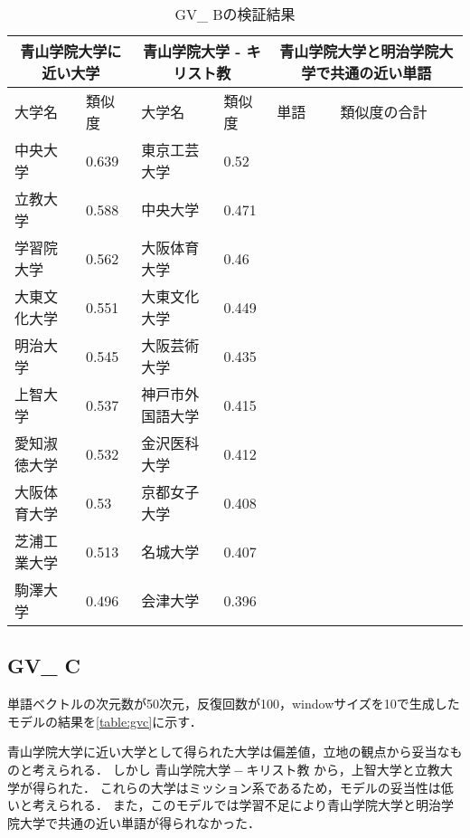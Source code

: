 \begin{table}[H]
\caption{GV\_ Bの検証結果}
\centering
\footnotesize
\begin{tabular}{ll|ll|ll}
\hline
\multicolumn{2}{c}{青山学院大学に近い大学} & \multicolumn{2}{c}{青山学院大学 - キリスト教} & \multicolumn{2}{c}{青山学院大学と明治学院大学で共通の近い単語}
\\ \hline
大学名 & 類似度 & 大学名 & 類似度 & 単語 & 類似度の合計
\\ \hline \hline
中央大学 & 0.639 & 東京工芸大学 & 0.52 & & \\
立教大学 & 0.588 & 中央大学 & 0.471 & & \\
学習院大学 & 0.562 & 大阪体育大学 & 0.46 & & \\
大東文化大学 & 0.551 & 大東文化大学 & 0.449 & & \\
明治大学 & 0.545 & 大阪芸術大学 & 0.435 & & \\
上智大学 & 0.537 & 神戸市外国語大学 & 0.415 & & \\
愛知淑徳大学 & 0.532 & 金沢医科大学 & 0.412 & & \\
大阪体育大学 & 0.53 & 京都女子大学 & 0.408 & & \\
芝浦工業大学 & 0.513 & 名城大学 & 0.407 & & \\
駒澤大学 & 0.496 & 会津大学 & 0.396 & & \\ \hline
\end{tabular}
\label{table:gvb}
\end{table}

\subsection{GV\_ C}
単語ベクトルの次元数が50次元，反復回数が100，windowサイズを10で生成したモデルの結果を\ref{table:gvc}に示す．

青山学院大学に近い大学として得られた大学は偏差値，立地の観点から妥当なものと考えられる．
しかし $ 青山学院大学 - キリスト教 $ から，上智大学と立教大学が得られた．
これらの大学はミッション系であるため，モデルの妥当性は低いと考えられる．
また，このモデルでは学習不足により青山学院大学と明治学院大学で共通の近い単語が得られなかった．

